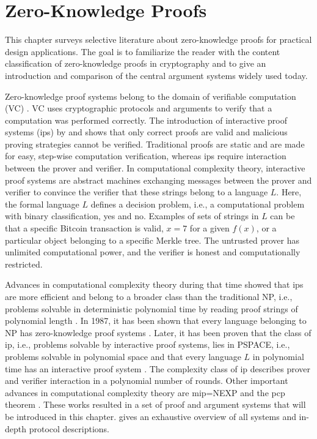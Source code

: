 \chapter{Zero-Knowledge Proofs}
This chapter surveys selective literature about zero-knowledge proofs for practical design applications. The goal is to familiarize the reader with the content classification of zero-knowledge proofs in cryptography and to give an introduction and comparison of the central argument systems widely used today. 

Zero-knowledge proof systems belong to the domain of verifiable computation (VC) \citep{Simunic, Ahmad}. VC uses cryptographic protocols and arguments to verify that a computation was performed correctly. The introduction of interactive proof systems (\acrshort{ip}s) by \citet{GoldwasserIPs} and \citet{BabaiIPs} shows that only correct proofs are valid and malicious proving strategies cannot be verified. Traditional proofs are static and are made for easy, step-wise computation verification, whereas \acrshort{ip}s require interaction between the prover and verifier. In computational complexity theory, interactive proof systems are abstract machines exchanging messages between the prover and verifier to convince the verifier that these strings belong to a language \(L\). Here, the formal language \(L\) defines a decision problem, i.e., a computational problem with binary classification, yes and no. Examples of sets of strings in \(L\) can be that a specific Bitcoin transaction is valid, \(x = 7\) for a given \(f(x)\), or a particular object belonging to a specific Merkle tree. The untrusted prover has unlimited computational power, and the verifier is honest and computationally restricted. 

Advances in computational complexity theory during that time showed that \acrshort{ip}s are more efficient and belong to a broader class than the traditional NP, i.e., problems solvable in deterministic polynomial time by reading proof strings of polynomial length \citep{IOPsdisc}. In 1987, it has been shown that every language belonging to NP has zero-knowledge proof systems \citep{anymental10.1145/28395.28420}. Later, it has been proven that the class of \acrshort{ip}, i.e., problems solvable by interactive proof systems, lies in PSPACE, i.e., problems solvable in polynomial space \citep{Shamir10.1145/146585.146609} and that every language \(L\) in polynomial time has an interactive proof system \citep{Lund10.1145/146585.146605}. The complexity class of \acrshort{ip} describes prover and verifier interaction in a polynomial number of rounds. Other important advances in computational complexity theory are \acrshort{mip}=NEXP \citep{Laszlo} and the \acrshort{pcp} theorem \citep{PCPTheorem}. These works resulted in a set of proof and argument systems that will be introduced in this chapter. \citet{Thaler} gives an exhaustive overview of all systems and in-depth protocol descriptions. 

